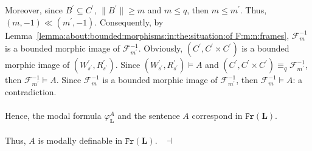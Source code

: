 \documentclass[draft]{article}
\newenvironment{proof}{{\bf Proof:}}{~$\dashv$\\}
\def\Fr{\mathtt{Fr}}
\def\L{\mathbf{L}}
\begin{document}
\begin{proof}
Moreover, since $B^{\prime}{\subseteq}C^{\prime}$, ${\parallel}B^{\prime}{\parallel}{\geq}m$ and $m{\leq}q$, then $m{\leq}m^{\prime}$.
Thus, $(m,{-}1){\ll}(m^{\prime},{-}1)$.
Consequently, by Lemma~\ref{lemma:about:bounded:morphisms:in:the:situation:of F:m:n:frames}, ${\mathcal F}_{m}^{{-}1}$ is a bounded morphic image of ${\mathcal F}_{m^{\prime}}^{{-}1}$.
Obviously, $(C^{\prime},C^{\prime}{\times}C^{\prime})$ is a bounded morphic image of $(W^{\prime}_{s^{\prime}},R^{\prime}_{s^{\prime}})$.
Since $(W^{\prime}_{s^{\prime}},R^{\prime}_{s^{\prime}}){\models}A$ and $(C^{\prime},C^{\prime}{\times}C^{\prime}){\equiv_{q}}
%
%
%
%
%
%
%
%
%
%
%
%
$\linebreak$
%
%
%
%
%
%
%
%
%
%
%
%
{\mathcal F}_{m^{\prime}}^{{-}1}$, then ${\mathcal F}_{m^{\prime}}^{{-}1}{\models}A$.
Since ${\mathcal F}_{m}^{{-}1}$ is a bounded morphic image of ${\mathcal F}_{m^{\prime}}^{{-}1}$, then ${\mathcal F}_{m}^{{-}1}{\models}A$: a contradiction.
%
%
\\
\\
%
%
Hence, the modal formula $\varphi_{\L}^{A}$ and the sentence $A$ correspond in $\Fr(\L)$.
%
%
\\
\\
%
%
Thus, $A$ is modally definable in $\Fr(\L)$.
%
%
\medskip
%
%
\end{proof}
%
%
%
%
\end{document}

